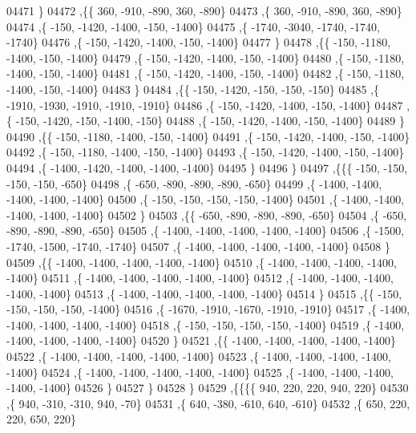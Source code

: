 \begin{DoxyCode}
04471     \}
04472    ,\{\{   360,  -910,  -890,   360,  -890\}
04473     ,\{   360,  -910,  -890,   360,  -890\}
04474     ,\{  -150, -1420, -1400,  -150, -1400\}
04475     ,\{ -1740, -3040, -1740, -1740, -1740\}
04476     ,\{  -150, -1420, -1400,  -150, -1400\}
04477     \}
04478    ,\{\{  -150, -1180, -1400,  -150, -1400\}
04479     ,\{  -150, -1420, -1400,  -150, -1400\}
04480     ,\{  -150, -1180, -1400,  -150, -1400\}
04481     ,\{  -150, -1420, -1400,  -150, -1400\}
04482     ,\{  -150, -1180, -1400,  -150, -1400\}
04483     \}
04484    ,\{\{  -150, -1420,  -150,  -150,  -150\}
04485     ,\{ -1910, -1930, -1910, -1910, -1910\}
04486     ,\{  -150, -1420, -1400,  -150, -1400\}
04487     ,\{  -150, -1420,  -150, -1400,  -150\}
04488     ,\{  -150, -1420, -1400,  -150, -1400\}
04489     \}
04490    ,\{\{  -150, -1180, -1400,  -150, -1400\}
04491     ,\{  -150, -1420, -1400,  -150, -1400\}
04492     ,\{  -150, -1180, -1400,  -150, -1400\}
04493     ,\{  -150, -1420, -1400,  -150, -1400\}
04494     ,\{ -1400, -1420, -1400, -1400, -1400\}
04495     \}
04496    \}
04497   ,\{\{\{  -150,  -150,  -150,  -150,  -650\}
04498     ,\{  -650,  -890,  -890,  -890,  -650\}
04499     ,\{ -1400, -1400, -1400, -1400, -1400\}
04500     ,\{  -150,  -150,  -150,  -150, -1400\}
04501     ,\{ -1400, -1400, -1400, -1400, -1400\}
04502     \}
04503    ,\{\{  -650,  -890,  -890,  -890,  -650\}
04504     ,\{  -650,  -890,  -890,  -890,  -650\}
04505     ,\{ -1400, -1400, -1400, -1400, -1400\}
04506     ,\{ -1500, -1740, -1500, -1740, -1740\}
04507     ,\{ -1400, -1400, -1400, -1400, -1400\}
04508     \}
04509    ,\{\{ -1400, -1400, -1400, -1400, -1400\}
04510     ,\{ -1400, -1400, -1400, -1400, -1400\}
04511     ,\{ -1400, -1400, -1400, -1400, -1400\}
04512     ,\{ -1400, -1400, -1400, -1400, -1400\}
04513     ,\{ -1400, -1400, -1400, -1400, -1400\}
04514     \}
04515    ,\{\{  -150,  -150,  -150,  -150, -1400\}
04516     ,\{ -1670, -1910, -1670, -1910, -1910\}
04517     ,\{ -1400, -1400, -1400, -1400, -1400\}
04518     ,\{  -150,  -150,  -150,  -150, -1400\}
04519     ,\{ -1400, -1400, -1400, -1400, -1400\}
04520     \}
04521    ,\{\{ -1400, -1400, -1400, -1400, -1400\}
04522     ,\{ -1400, -1400, -1400, -1400, -1400\}
04523     ,\{ -1400, -1400, -1400, -1400, -1400\}
04524     ,\{ -1400, -1400, -1400, -1400, -1400\}
04525     ,\{ -1400, -1400, -1400, -1400, -1400\}
04526     \}
04527    \}
04528   \}
04529  ,\{\{\{\{   940,   220,   220,   940,   220\}
04530     ,\{   940,  -310,  -310,   940,   -70\}
04531     ,\{   640,  -380,  -610,   640,  -610\}
04532     ,\{   650,   220,   220,   650,   220\}

\end{DoxyCode}
